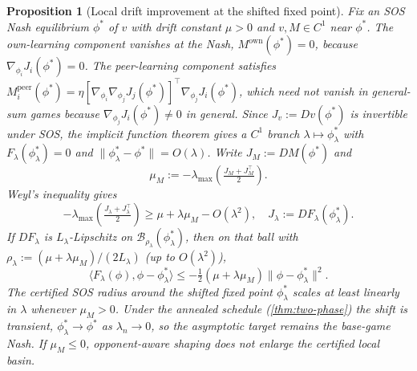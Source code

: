 \documentclass{article}
\theoremstyle{plain}
\newtheorem{proposition}[theorem]{Proposition}
\theoremstyle{definition}
\theoremstyle{remark}
\newcommand{\B}{\mathcal{B}}
\begin{document}
\begin{proposition}[Local drift improvement at the shifted fixed point]\label{prop:basin}
Fix an SOS Nash equilibrium $\phi^\ast$ of $v$ with drift constant $\mu>0$ and $v,M\in C^1$ near $\phi^\ast$. The own-learning component vanishes at the Nash, $M^{\mathrm{own}}(\phi^\ast)=0$, because $\nabla_{\phi_i}J_i(\phi^\ast)=0$. The peer-learning component satisfies $M^{\mathrm{peer}}_i(\phi^\ast)=\eta[\nabla_{\phi_i}\nabla_{\phi_j}J_j(\phi^\ast)]^\top\nabla_{\phi_j}J_i(\phi^\ast)$, which need not vanish in general-sum games because $\nabla_{\phi_j}J_i(\phi^\ast)\ne0$ in general. Since $J_v:=Dv(\phi^\ast)$ is invertible under SOS, the implicit function theorem gives a $C^1$ branch $\lambda\mapsto\phi^\ast_\lambda$ with $F_\lambda(\phi^\ast_\lambda)=0$ and $\|\phi^\ast_\lambda-\phi^\ast\|=O(\lambda)$. Write $J_M:=DM(\phi^\ast)$ and
\[
\mu_M:=-\lambda_{\max}\!\left(\tfrac{J_M+J_M^\top}{2}\right).
\]
Weyl's inequality gives
\begin{equation}\label{eq:weyl}
-\lambda_{\max}\!\left(\tfrac{J_\lambda+J_\lambda^\top}{2}\right)\ge \mu+\lambda\mu_M-O(\lambda^2),
\quad J_\lambda:=DF_\lambda(\phi^\ast_\lambda).
\end{equation}
If $DF_\lambda$ is $L_\lambda$-Lipschitz on $\B_{\rho_\lambda}(\phi^\ast_\lambda)$, then on that ball with $\rho_\lambda:=(\mu+\lambda\mu_M)/(2L_\lambda)$ (up to $O(\lambda^2)$),
\[
\langle F_\lambda(\phi),\phi-\phi^\ast_\lambda\rangle\le -\tfrac{1}{2}(\mu+\lambda\mu_M)\|\phi-\phi^\ast_\lambda\|^2 .
\]
The certified SOS radius around the \emph{shifted} fixed point $\phi^\ast_\lambda$ scales at least linearly in $\lambda$ whenever $\mu_M>0$. Under the annealed schedule (\cref{thm:two-phase}) the shift is transient, $\phi^\ast_\lambda\to\phi^\ast$ as $\lambda_n\to0$, so the asymptotic target remains the base-game Nash. If $\mu_M\le0$, opponent-aware shaping does not enlarge the certified local basin.
\end{proposition}
\end{document}
